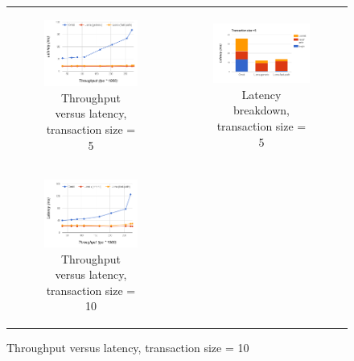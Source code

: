 \begin{figure}[t]
\begin{tabular}{cc}
  \begin{subfigure}[t]{0.5\textwidth}
	\includegraphics[width=.8\textwidth]{figs/thpt-latency-5.png}
	\caption[]{Throughput versus latency, transaction size = 5}
    \label{fig:tl-5}
  \end{subfigure} &

   \begin{subfigure}[t]{0.5\textwidth}
	\includegraphics[width=.9\textwidth]{figs/stack-tx5.png}
	\caption[]{Latency breakdown, transaction size = 5}
    \label{fig:stack-tx5}
  \end{subfigure} \\
  
    \begin{subfigure}[t]{0.5\textwidth}
	\includegraphics[width=.8\textwidth]{figs/thpt-latency-10.png}
	\caption[]{Throughput versus latency, transaction size = 10}
    \label{fig:tl-10}
  \end{subfigure} &
  

\end{tabular}
\end{figure}
